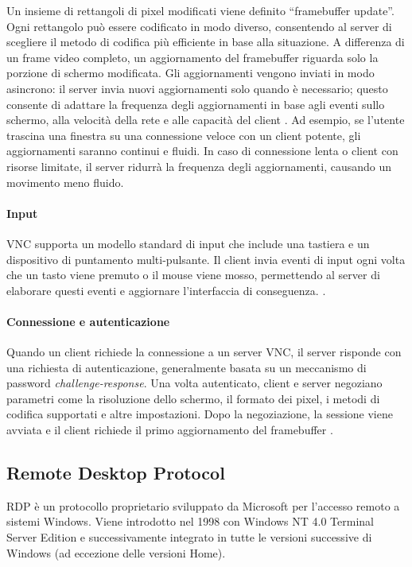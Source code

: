 \documentclass[12pt,a4paper,openright,twoside]{book}
\begin{document}
Un insieme di rettangoli di pixel modificati viene definito ``framebuffer update''.
Ogni rettangolo può essere codificato in modo diverso,
consentendo al server di scegliere il metodo di codifica più efficiente in base alla situazione.
%
A differenza di un frame video completo,
un aggiornamento del framebuffer riguarda solo la porzione di schermo modificata.
%
Gli aggiornamenti vengono inviati in modo asincrono: il server invia nuovi aggiornamenti solo quando è necessario;
questo consente di adattare la frequenza degli aggiornamenti in base agli eventi sullo schermo, alla velocità della rete e alle capacità del client \cite{richardson1998vnc}.
%
Ad esempio, se l'utente trascina una finestra su una connessione veloce con un client potente,
gli aggiornamenti saranno continui e fluidi. In caso di connessione lenta o client con risorse limitate,
il server ridurrà la frequenza degli aggiornamenti, causando un movimento meno fluido.

\paragraph{Input}
\ac{VNC} supporta un modello standard di input che include una tastiera e un dispositivo di puntamento multi-pulsante.
Il client invia eventi di input ogni volta che un tasto viene premuto o il mouse viene mosso, permettendo al server di elaborare questi eventi e aggiornare l'interfaccia di conseguenza. \cite{richardson1998vnc}.

\paragraph{Connessione e autenticazione}
Quando un client richiede la connessione a un server \ac{VNC},
il server risponde con una richiesta di autenticazione,
generalmente basata su un meccanismo di password \textit{challenge-response}.
%
Una volta autenticato, client e server negoziano parametri come la risoluzione dello schermo,
il formato dei pixel, i metodi di codifica supportati e altre impostazioni.
%
Dopo la negoziazione, la sessione viene avviata e il client richiede il primo aggiornamento del framebuffer \cite{richardson1998vnc}.

\subsection{Remote Desktop Protocol}
\label{sec:rdp}
\ac{RDP} è un protocollo proprietario sviluppato da Microsoft per l'accesso remoto a sistemi Windows.
Viene introdotto nel 1998 con Windows NT 4.0 Terminal Server Edition e successivamente integrato in tutte le versioni successive di Windows (ad eccezione delle versioni Home).
\end{document}
